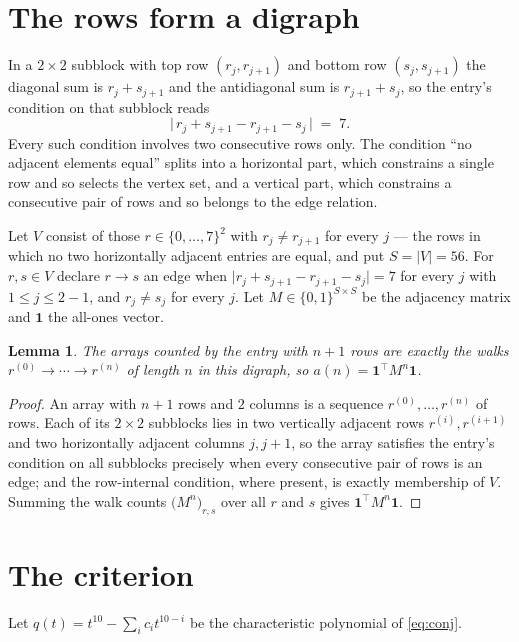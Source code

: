 \documentclass[11pt,a4paper]{article}
\theoremstyle{plain}
\newtheorem{lemma}[theorem]{Lemma}
\theoremstyle{definition}
\begin{document}
\section{The rows form a digraph}

In a $2\times2$ subblock with top row $(r_j,r_{j+1})$ and bottom row $(s_j,s_{j+1})$ the
diagonal sum is $r_j+s_{j+1}$ and the antidiagonal sum is $r_{j+1}+s_j$, so the entry's
condition on that subblock reads
\[
\bigl|\,r_j+s_{j+1}-r_{j+1}-s_j\,\bigr|\;=\;7.
\]
Every such condition involves two consecutive rows only. The condition ``no adjacent elements equal'' splits into a horizontal
part, which constrains a single row and so selects the vertex set, and a vertical part,
which constrains a consecutive pair of rows and so belongs to the edge relation.

Let $V$ consist of those $r\in\{0,\dots,7\}^{2}$ with $r_j\ne r_{j+1}$ for every
$j$ --- the rows in which no two horizontally adjacent entries are equal, and put $S=|V|=56$. For $r,s\in V$ declare $r\to s$ an edge
when $\bigl|r_j+s_{j+1}-r_{j+1}-s_j\bigr|=7$ for every $j$ with
$1\le j\le2-1$, and $r_j\ne s_j$ for every $j$. Let $M\in\{0,1\}^{S\times S}$ be the adjacency matrix and $\mathbf{1}$
the all-ones vector.

\begin{lemma}\label{lem:walk}
The arrays counted by the entry with $n+1$ rows are exactly the walks
$r^{(0)}\to\cdots\to r^{(n)}$ of length $n$ in this digraph, so
$a(n)=\mathbf{1}^{\!\top}M^{n}\mathbf{1}$.
\end{lemma}

\begin{proof}
An array with $n+1$ rows and $2$ columns is a sequence $r^{(0)},\dots,r^{(n)}$ of
rows. Each of its $2\times2$ subblocks lies in two vertically adjacent rows
$r^{(i)},r^{(i+1)}$ and two horizontally adjacent columns $j,j+1$, so the array satisfies
the entry's condition on all subblocks precisely when every consecutive pair of rows is an
edge; and the row-internal condition, where present, is exactly membership of $V$. Summing
the walk counts $\bigl(M^{n}\bigr)_{r,s}$ over all $r$ and $s$ gives
$\mathbf{1}^{\!\top}M^{n}\mathbf{1}$.
\end{proof}

\section{The criterion}

Let $q(t)=t^{10}-\sum_i c_i t^{10-i}$ be the characteristic polynomial of
\eqref{eq:conj}.
\end{document}

